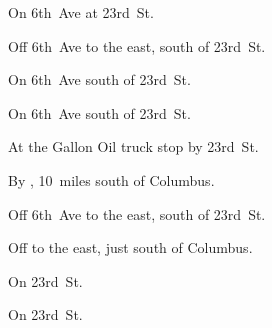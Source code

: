 
\begin{LocationList}

On 6th~Ave at  23rd~St.

Off 6th~Ave to the east, south of  23rd~St.

On 6th~Ave south of  23rd~St.

On 6th~Ave south of  23rd~St.

At the Gallon Oil truck stop by  23rd~St.

By , 10~miles south of Columbus.

Off 6th~Ave to the east, south of  23rd~St.

Off   to the east, just south of Columbus.

\Location{\TruckService \Service}
On  23rd~St.

On  23rd~St.

\end{LocationList}
